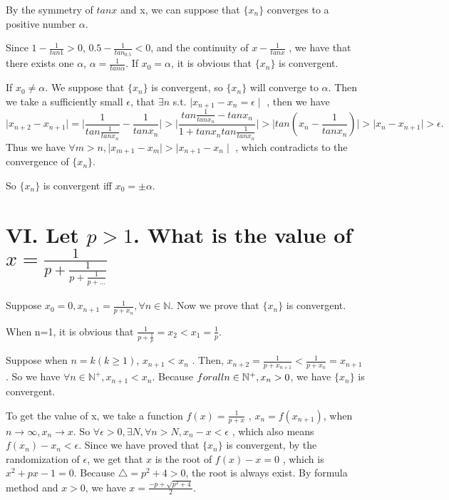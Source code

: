 \documentclass[twoside,a4paper]{article}
\begin{document}
By the symmetry of $tanx$ and x, we can suppose that  $\{x_{n}\}$ 
converges to a positive number $\alpha$.

Since  $1-\frac{1}{tan1}>0$, $0.5-\frac{1}{tan_0.5}<0$, and the continuity of $x-\frac{1}{tanx}$
, we have that there exists one $\alpha$,  $\alpha=\frac{1}{tan\alpha}$.
If $x_{0}=\alpha$, it is obvious that $\{x_{n}\}$ is convergent.

If $x_{0}\neq \alpha$.
We suppose that $\{x_{n}\}$ is convergent, so $\{x_{n}\}$ will converge to $\alpha$.
Then we take a sufficiently small $\epsilon$, that  $\exists n$ s.t. $ \mid x_{n+1}-x_{n}=\epsilon \mid $
, then we have 
\[
 \mid x_{n+2}-x_{n+1} \mid =  \mid \frac{1}{tan\frac{1}{tanx_{n}}}-\frac{1}{tanx_{n}} \mid 
 > \mid \frac{tan\frac{1}{tanx_{n}}-tanx_{n}}{1+tanx_{n}tan\frac{1}{tanx_{n}}} \mid
 > \mid tan\left(  x_{n}-\frac{1}{tanx_{n}}\right)  \mid
 > \mid x_{n}-x_{n+1} \mid>\epsilon
.\] 
Thus we have $\forall m>n,  \mid  x_{m+1}-x_{m}\mid> \mid  x_{n+1}-x_{n}\mid  $ 
, which contradicts to the convergence of $\{x_{n}\}$.

So $\{x_{n}\}$ is convergent iff $x_{0}=\pm\alpha$.

\section*{VI. \small{Let $p>1$. What is the value 
of $x=\frac{1}{p+\frac{1}{p+\frac{1}{p+\ldots}}}$}}

Suppose $x_0=0, x_{n+1}=\frac{1}{p+x_{n}}, \forall n\in\mathbb{N}$.
Now we prove that $\{x_{n}\}$ is convergent.

When n=1, it is obvious that $\frac{1}{p+\frac{1}{p}}=x_2<x_1=\frac{1}{p}$.

Suppose when $n=k\left(  k\ge 1\right) $, $x_{n+1}<x_{n}$
. Then, $x_{n+2}=\frac{1}{p+x_{n+1}}<\frac{1}{p+x_{n}}=x_{n+1}$.
So we have $\forall n\in \mathbb{N}^{+}, x_{n+1}<x_{n}$.
Because $\\forall n\in\mathbb{N}^{+}, x_{n}>0$, we have $\{x_{n}\}$ is convergent.

To get the value of x, we take a function $f\left( x\right)=\frac{1}{p+x} $
, $x_{n}=f\left( x_{n+1} \right) $, when $n\to \infty, x_{n}\to x$.
So $\forall \epsilon>0, \exists N, \forall n>N, x_{n}-x<\epsilon$
, which also means $f\left( x_{n}\right)-x_{n}<\epsilon$.
Since we have proved that $\{x_{n}\}$ is convergent, by the randomization of $\epsilon$, we get that  $x$ is the root of  $f\left(  x\right)-x=0$
, which is $x^2+px-1=0$. Because $\bigtriangleup=p^2+4>0$, the root is always exist. By formula method and $x>0$, we have $x=\frac{-p+\sqrt{p^2+4} }{2}$.
\end{document}
